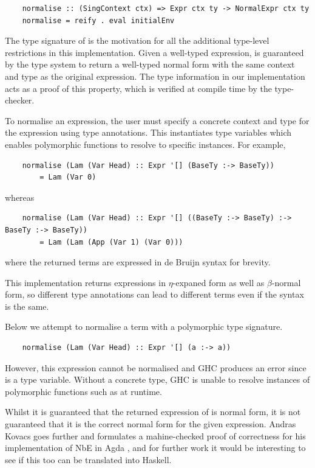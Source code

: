 \begin{lstlisting}
    normalise :: (SingContext ctx) => Expr ctx ty -> NormalExpr ctx ty
    normalise = reify . eval initialEnv
\end{lstlisting}

The type signature of  is the motivation for all the additional type-level restrictions in this implementation. Given a well-typed expression,  is guaranteed by the type system to return a well-typed normal form with the same context and type as the original expression. The type information in our implementation acts as a proof of this property, which is verified at compile time by the type-checker.

To normalise an expression, the user must specify a concrete context and type for the expression using type annotations. This instantiates type variables which enables polymorphic functions to resolve to specific instances. For example,

\begin{lstlisting}
    normalise (Lam (Var Head) :: Expr '[] (BaseTy :-> BaseTy)) 
        = Lam (Var 0)
\end{lstlisting}

whereas

\begin{lstlisting}
    normalise (Lam (Var Head) :: Expr '[] ((BaseTy :-> BaseTy) :-> BaseTy :-> BaseTy))
        = Lam (Lam (App (Var 1) (Var 0)))
\end{lstlisting}

where the returned terms are expressed in de Bruijn syntax for brevity.

This implementation returns expressions in $\eta$-expaned form as well as $\beta$-normal form, so different type annotations can lead to different terms even if the syntax is the same. 

Below we attempt to normalise a term with a polymorphic type signature.

\begin{lstlisting}
    normalise (Lam (Var Head) :: Expr '[] (a :-> a))
\end{lstlisting}

However, this expression cannot be normalised and GHC produces an error since  is a type variable. Without a concrete type, GHC is unable to resolve instances of polymorphic functions such as  at runtime.

Whilst it is guaranteed that the returned expression of  is normal form, it is not guaranteed that it is the correct normal form for the given expression. Andras Kovacs goes further and formulates a mahine-checked proof of correctness for his implementation of NbE in Agda \cite{AgdaNbe}, and for further work it would be interesting to see if this too can be translated into Haskell.

